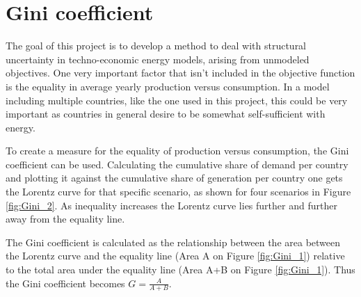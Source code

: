 \section{Gini coefficient}

The goal of this project is to develop a method to deal with structural uncertainty in techno-economic energy models, arising from unmodeled objectives. One very important factor that isn't included in the objective function is the equality in average yearly production versus consumption. In a model including multiple countries, like the one used in this project, this could be very important as countries in general desire to be somewhat self-sufficient with energy. 

To create a measure for the equality of production versus consumption, the Gini coefficient can be used. Calculating the cumulative share of demand per country and plotting it against the cumulative share of generation per country one gets the Lorentz curve for that specific scenario, as shown for four scenarios in Figure \ref{fig:Gini_2}. As inequality increases the Lorentz curve lies further and further away from the equality line. 

The Gini coefficient is calculated as the relationship between the area between the Lorentz curve and the equality line (Area A on Figure \ref{fig:Gini_1}) relative to the total area under the equality line  (Area A+B on Figure \ref{fig:Gini_1}). Thus the Gini coefficient becomes $G = \frac{A}{A+B}$.

